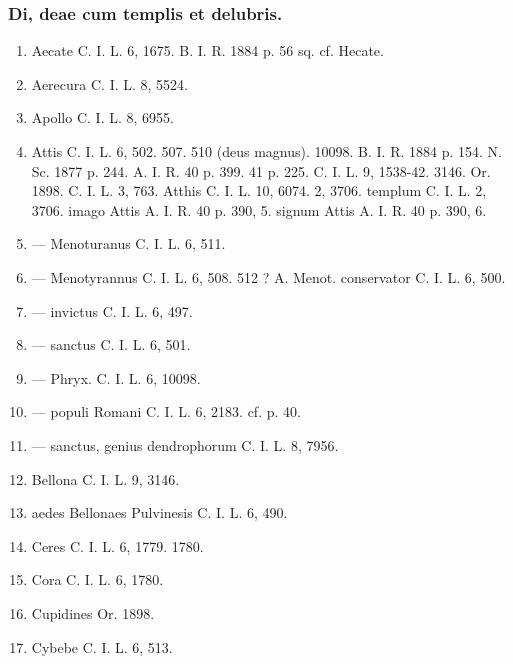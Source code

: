 \documentclass[a4paper, 11pt, oneside, polutonikogreek, german, twocolumn]{article}
\begin{document}
\subsubsection{Di, deae cum templis et delubris.}
\begin{enumerate}
\item Aecate C. I. L. 6, 1675. B. I. R. 1884 p. 56 sq. cf. Hecate.

\item Aerecura C. I. L. 8, 5524.

\item Apollo C. I. L. 8, 6955.

\item Attis C. I. L. 6, 502. 507. 510 (deus magnus). 10098. B. I. R. 1884 p. 154. N. Sc. 1877 p. 244. A. I. R. 40 p. 399. 41 p. 225. C. I. L. 9, 1538-42. 3146. Or. 1898. C. I. L. 3, 763. Atthis C. I. L. 10, 6074. 2, 3706. templum C. I. L. 2, 3706. imago Attis A. I. R. 40 p. 390, 5. signum Attis A. I. R. 40 p. 390, 6.

\item --- Menoturanus C. I. L. 6, 511.

\item --- Menotyrannus C. I. L. 6, 508. 512 ? A. Menot. conservator C. I. L. 6, 500.

\item --- invictus C. I. L. 6, 497.

\item --- sanctus C. I. L. 6, 501.

\item --- Phryx. C. I. L. 6, 10098.

\item --- populi Romani C. I. L. 6, 2183. cf. p. 40.

\item --- sanctus, genius dendrophorum C. I. L. 8, 7956.

\item Bellona C. I. L. 9, 3146.

\item aedes Bellonaes Pulvinesis C. I. L. 6, 490.

\item Ceres C. I. L. 6, 1779. 1780.

\item Cora C. I. L. 6, 1780.

\item Cupidines Or. 1898.

\item Cybebe C. I. L. 6, 513.


\end{enumerate}
\end{document}
